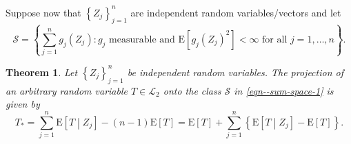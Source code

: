 \documentclass[12pt]{article}
\numberwithin{equation}{section}
\theoremstyle{definition}
\theoremstyle{plain}
\newtheorem{theorem}{Theorem}[section]
\begin{document}
Suppose now that \(\left\{ Z_{j} \right\}_{j = 1}^{n}\) are independent random
variables/vectors and let
\begin{equation}
  \mathcal{S} = \left\{ \sum_{j = 1}^{n} g_{j} \left( Z_{j} \right) : g_{j}
  \text{ measurable and } \mathrm{E} \left[ g_{j} \left( Z_{j} \right)^{2}
  \right] < \infty \text{ for all } j = 1, \dots, n \right\}.
  \label{eqn--sum-space-1}
\end{equation}

\begin{theorem}
\label{thm--proj-sum-space}
Let \(\left\{ Z_{j} \right\}_{j = 1}^{n}\) be independent random variables.
The projection of an arbitrary random variable \(T \in \mathscr{L}_{2}\) onto
the class \(\mathcal{S}\) in \eqref{eqn--sum-space-1} is given by
\begin{equation*}
  T_{\ast} = \sum_{j = 1}^{n} \mathrm{E} \left[ T \middle| Z_{j} \right] - (n -
  1) \mathrm{E} [T] = \mathrm{E} [T] + \sum_{j = 1}^{n} \left\{ \mathrm{E}
  \left[ T \middle| Z_{j} \right] - \mathrm{E} [T] \right\}.
\end{equation*}
\end{theorem}
\end{document}
